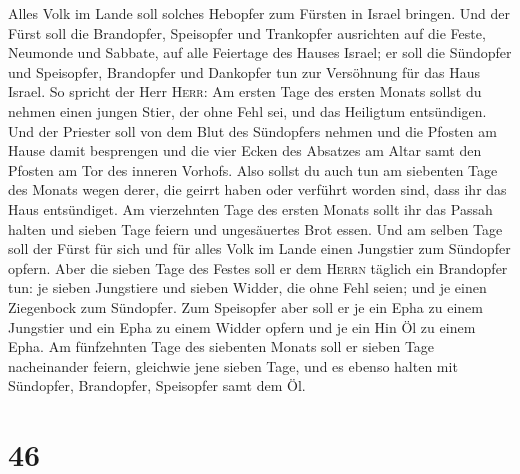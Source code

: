 Alles Volk im Lande soll solches Hebopfer zum Fürsten in Israel bringen.
 Und der Fürst soll die Brandopfer, Speisopfer und
Trankopfer ausrichten auf die Feste, Neumonde und Sabbate, auf alle
Feiertage des Hauses Israel; er soll die Sündopfer und Speisopfer,
Brandopfer und Dankopfer tun zur Versöhnung für das Haus Israel.
 So spricht der Herr \textsc{Herr}: Am ersten Tage des
ersten Monats sollst du nehmen einen jungen Stier, der ohne Fehl sei,
und das Heiligtum entsündigen.  Und der Priester soll von
dem Blut des Sündopfers nehmen und die Pfosten am Hause damit besprengen
und die vier Ecken des Absatzes am Altar samt den Pfosten am Tor des
inneren Vorhofs.  Also sollst du auch tun am siebenten
Tage des Monats wegen derer, die geirrt haben oder verführt worden sind,
dass ihr das Haus entsündiget.  Am vierzehnten Tage des
ersten Monats sollt ihr das Passah halten und sieben Tage feiern und
ungesäuertes Brot essen.  Und am selben Tage soll der
Fürst für sich und für alles Volk im Lande einen Jungstier zum Sündopfer
opfern.  Aber die sieben Tage des Festes soll er dem
\textsc{Herrn} täglich ein Brandopfer tun: je sieben Jungstiere und
sieben Widder, die ohne Fehl seien; und je einen Ziegenbock zum
Sündopfer.  Zum Speisopfer aber soll er je ein Epha zu
einem Jungstier und ein Epha zu einem Widder opfern und je ein Hin Öl zu
einem Epha.  Am fünfzehnten Tage des siebenten Monats
soll er sieben Tage nacheinander feiern, gleichwie jene sieben Tage, und
es ebenso halten mit Sündopfer, Brandopfer, Speisopfer samt dem Öl.

\hypertarget{section-45}{%
\section{46}\label{section-45}}

